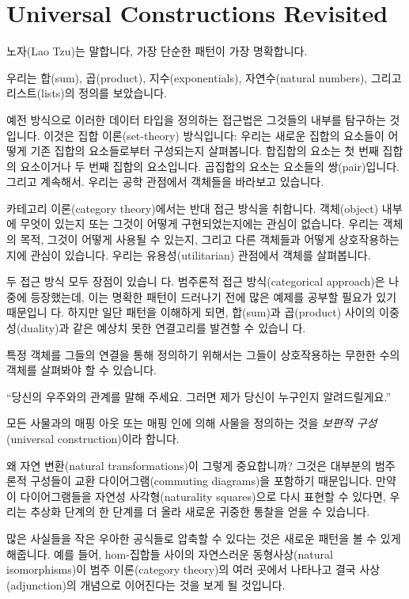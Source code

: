 \documentclass[DaoFP]{subfiles}
\begin{document}
\section{Universal Constructions Revisited}

노자(Lao Tzu)는 말합니다, 가장 단순한 패턴이 가장 명확합니다.

우리는 합(sum), 곱(product), 지수(exponentials), 자연수(natural numbers), 그리고 리스트(lists)의 정의를 보았습니다.

예전 방식으로 이러한 데이터 타입을 정의하는 접근법은 그것들의 내부를 탐구하는 것입니다. 이것은 집합 이론(set-theory) 방식입니다: 우리는 새로운 집합의 요소들이 어떻게 기존 집합의 요소들로부터 구성되는지 살펴봅니다. 합집합의 요소는 첫 번째 집합의 요소이거나 두 번째 집합의 요소입니다. 곱집합의 요소는 요소들의 쌍(pair)입니다. 그리고 계속해서. 우리는 공학 관점에서 객체들을 바라보고 있습니다.

카테고리 이론(category theory)에서는 반대 접근 방식을 취합니다. 객체(object) 내부에 무엇이 있는지 또는 그것이 어떻게 구현되었는지에는 관심이 없습니다. 우리는 객체의 목적, 그것이 어떻게 사용될 수 있는지, 그리고 다른 객체들과 어떻게 상호작용하는지에 관심이 있습니다. 우리는 유용성(utilitarian) 관점에서 객체를 살펴봅니다.

두 접근 방식 모두 장점이 있습니 다. 범주론적 접근 방식(categorical approach)은 나중에 등장했는데, 이는 명확한 패턴이 드러나기 전에 많은 예제를 공부할 필요가 있기 때문입니 다. 하지만 일단 패턴을 이해하게 되면, 합(sum)과 곱(product) 사이의 이중성(duality)과 같은 예상치 못한 연결고리를 발견할 수 있습니 다.

특정 객체를 그들의 연결을 통해 정의하기 위해서는 그들이 상호작용하는 무한한 수의 객체를 살펴봐야 할 수 있습니다.

``당신의 우주와의 관계를 말해 주세요. 그러면 제가 당신이 누구인지 알려드릴게요.''

모든 사물과의 매핑 아웃 또는 매핑 인에 의해 사물을 정의하는 것을 \emph{보편적 구성}(universal construction)이라 합니다.

왜 자연 변환(natural transformations)이 그렇게 중요합니까? 그것은 대부분의 범주론적 구성들이 교환 다이어그램(commuting diagrams)을 포함하기 때문입니다. 만약 이 다이어그램들을 자연성 사각형(naturality squares)으로 다시 표현할 수 있다면, 우리는 추상화 단계의 한 단계를 더 올라 새로운 귀중한 통찰을 얻을 수 있습니다.

많은 사실들을 작은 우아한 공식들로 압축할 수 있다는 것은 새로운 패턴을 볼 수 있게 해줍니다. 
예를 들어, hom-집합들 사이의 자연스러운 동형사상(natural isomorphisms)이 범주 이론(category theory)의 여러 곳에서 나타나고 
결국 사상(adjunction)의 개념으로 이어진다는 것을 보게 될 것입니다.
\end{document}

